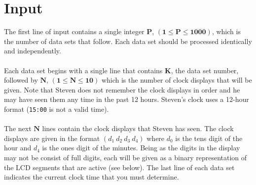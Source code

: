 \documentclass[a4paper,11pt,oneside]{article}
\begin{document}
\section{Input}
The first line of input contains a single integer $\boldsymbol{P}$,
$(\boldsymbol{1} \le \boldsymbol{P} \le \boldsymbol{1000})$, which is the
number of data sets that follow. Each data set should be processed identically
and independently.
\\\\
Each data set begins with a single line that contains $\boldsymbol{K}$, the data
set number, followed by $\boldsymbol{N}$,
$(\boldsymbol{1} \le \boldsymbol{N} \le \boldsymbol{10})$ which is the number
of clock displays that will be given. Note that Steven does not
remember the clock displays in order and he may have seen them any time in the past
12 hours. Steven's clock uses a 12-hour format (\texttt{15:00} is not a valid time).
\\\\
The next $\boldsymbol{N}$ lines  contain the clock displays that Steven has seen.
The clock displays are given in the format $(d_1\ d_2\ d_3\ d_4)$ where $d_0$ is
the tens digit of the hour and $d_4$ is the ones digit of the minutes. Being as
the digits in the display may not be consist of full digits, each will be given as
a binary representation of the LCD segments that are active (see below). The last
line of each data set indicates the current clock time that you must determine.
\end{document}
